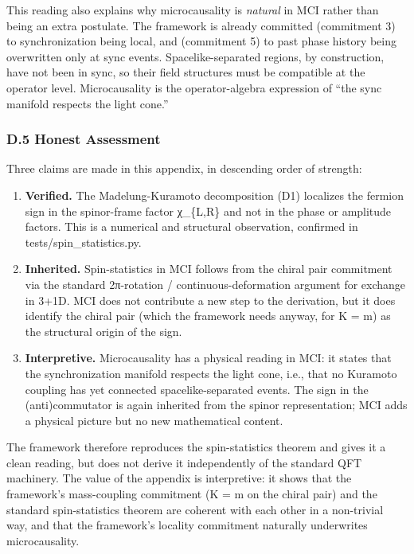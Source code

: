 \documentclass[
]{article}
\begin{document}
This reading also explains why microcausality is \emph{natural} in MCI
rather than being an extra postulate. The framework is already committed
(commitment 3) to synchronization being local, and (commitment 5) to
past phase history being overwritten only at sync events.
Spacelike-separated regions, by construction, have not been in sync, so
their field structures must be compatible at the operator level.
Microcausality is the operator-algebra expression of ``the sync manifold
respects the light cone.''

\subsubsection{D.5 Honest Assessment}\label{d.5-honest-assessment}

Three claims are made in this appendix, in descending order of strength:

\begin{enumerate}
\def\labelenumi{\arabic{enumi}.}
\item
  \textbf{Verified.} The Madelung-Kuramoto decomposition (D1) localizes
  the fermion sign in the spinor-frame factor χ\_\{L,R\} and not in the
  phase or amplitude factors. This is a numerical and structural
  observation, confirmed in tests/spin\_statistics.py.
\item
  \textbf{Inherited.} Spin-statistics in MCI follows from the chiral
  pair commitment via the standard 2π-rotation / continuous-deformation
  argument for exchange in 3+1D. MCI does not contribute a new step to
  the derivation, but it does identify the chiral pair (which the
  framework needs anyway, for K = m) as the structural origin of the
  sign.
\item
  \textbf{Interpretive.} Microcausality has a physical reading in MCI:
  it states that the synchronization manifold respects the light cone,
  i.e., that no Kuramoto coupling has yet connected spacelike-separated
  events. The sign in the (anti)commutator is again inherited from the
  spinor representation; MCI adds a physical picture but no new
  mathematical content.
\end{enumerate}

The framework therefore reproduces the spin-statistics theorem and gives
it a clean reading, but does not derive it independently of the standard
QFT machinery. The value of the appendix is interpretive: it shows that
the framework's mass-coupling commitment (K = m on the chiral pair) and
the standard spin-statistics theorem are coherent with each other in a
non-trivial way, and that the framework's locality commitment naturally
underwrites microcausality.
\end{document}
